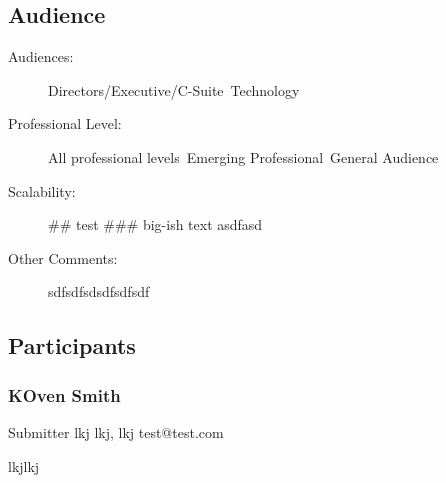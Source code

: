 \documentclass{report}
\begin{document}
              \subsection*{Audience}
                \begin{description}
                  \item [Audiences:]Directors/Executive/C-Suite~Technology~
                  \item[Professional Level:]All professional levels~Emerging Professional~General Audience~
                \item[Scalability:] ## test
### big-ish text
asdfasd

							
              \item[Other Comments:] sdfsdfsdsdfsdfsdf
              \end{description}
            \subsection*{Participants}
              \subsubsection*{ KOven Smith }
              Submitter\newline
              lkj\newline
              lkj, lkj
              \newline
              test@test.com\newline
              
              lkjlkj\newline

              


              

              

              

              

              
        
\end{document}

